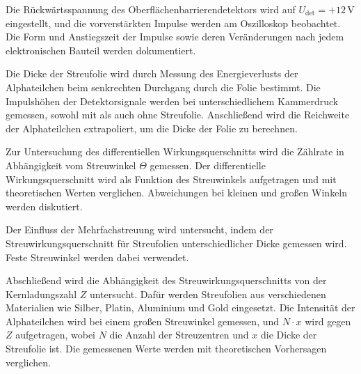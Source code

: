 Die Rückwärtsspannung des Oberflächenbarrierendetektors wird auf $U_{\text{det}} = +12\,\mathrm{V}$ eingestellt, und die vorverstärkten Impulse werden am Oszilloskop beobachtet. Die Form und Anstiegszeit der Impulse sowie deren Veränderungen nach jedem elektronischen Bauteil werden dokumentiert.

Die Dicke der Streufolie wird durch Messung des Energieverlusts der Alphateilchen beim senkrechten Durchgang durch die Folie bestimmt. Die Impulshöhen der Detektorsignale werden bei unterschiedlichem Kammerdruck gemessen, sowohl mit als auch ohne Streufolie. Anschließend wird die Reichweite der Alphateilchen extrapoliert, um die Dicke der Folie zu berechnen.

Zur Untersuchung des differentiellen Wirkungsquerschnitts wird die Zählrate in Abhängigkeit vom Streuwinkel $\Theta$ gemessen. Der differentielle Wirkungsquerschnitt wird als Funktion des Streuwinkels aufgetragen und mit theoretischen Werten verglichen. Abweichungen bei kleinen und großen Winkeln werden diskutiert.

Der Einfluss der Mehrfachstreuung wird untersucht, indem der Streuwirkungsquerschnitt für Streufolien unterschiedlicher Dicke gemessen wird. Feste Streuwinkel werden dabei verwendet.

Abschließend wird die Abhängigkeit des Streuwirkungsquerschnitts von der Kernladungszahl $Z$ untersucht. Dafür werden Streufolien aus verschiedenen Materialien wie Silber, Platin, Aluminium und Gold eingesetzt. Die Intensität der Alphateilchen wird bei einem großen Streuwinkel gemessen, und $N \cdot x$ wird gegen $Z$ aufgetragen, wobei $N$ die Anzahl der Streuzentren und $x$ die Dicke der Streufolie ist. Die gemessenen Werte werden mit theoretischen Vorhersagen verglichen.
